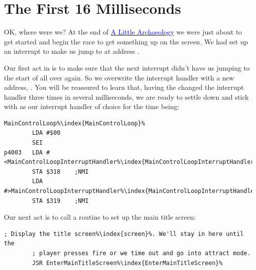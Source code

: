 \chapter{The First 16 Milliseconds} 
\label{sec:first16}
\lstset{style=6502Style}
OK, where were we? At the end of \hyperref[sec:archaeo]{\textcolor{blue}{A Little Archaeology}}
we were just about to get started and begin the race to get something up on the screen.
We had set up an interrupt to make us jump to  at address .

Our first act in  is to make sure that the next interrupt didn't
have us jumping to the start of  all over again. So we overwrite the interrupt handler with a new address,
. You will be reassured to learn that, having the changed the interrupt 
handler three times in several milliseconds, we are ready to settle down and stick with  as our
interrupt handler of choice for the time being:

\begin{lstlisting}[caption=The code at \icode{\$4000}. ,escapechar=\%]
MainControlLoop%\index{MainControlLoop}%
        LDA #$00
        SEI
p4003   LDA #<MainControlLoopInterruptHandler%\index{MainControlLoopInterruptHandler}%
        STA $318    ;NMI
        LDA #>MainControlLoopInterruptHandler%\index{MainControlLoopInterruptHandler}%
        STA $319    ;NMI
\end{lstlisting}

Our next act is to call a routine to set up the main title screen:

\begin{lstlisting}[caption=In \icode{MainControlLoop\index{MainControlLoop}},escapechar=\%]
        ; Display the title screen%\index{screen}%. We'll stay in here until the
        ; player presses fire or we time out and go into attract mode.
        JSR EnterMainTitleScreen%\index{EnterMainTitleScreen}%
\end{lstlisting}

